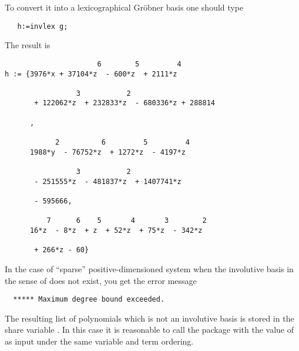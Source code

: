 \hypertarget{operator:INVLEX}{}
To convert it into a lexicographical Gr\"obner basis one should type
\begin{verbatim}
   h:=invlex g;
\end{verbatim}
The result is
\begin{verbatim}
                      6        5         4
h := {3976*x + 37104*z  - 600*z  + 2111*z

                 3           2
       + 122062*z  + 232833*z  - 680336*z + 288814

      ,

            2          6         5         4
      1988*y  - 76752*z  + 1272*z  - 4197*z

                 3           2
       - 251555*z  - 481837*z  + 1407741*z

       - 595666,

          7      6    5       4       3        2
      16*z  - 8*z  + z  + 52*z  + 75*z  - 342*z

       + 266*z - 60}

\end{verbatim}
In the case of ``sparse'' positive-dimensioned system
when the involutive basis in the sense of \cite{ZharkovBlinkov:93} does not exist,
you get the error message
\begin{verbatim}
  ***** Maximum degree bound exceeded.
\end{verbatim}
\hypertarget{variable:INVTEMPBASIS}{}
The resulting list of polynomials which is not an involutive
basis is stored in the share variable . In this case
it is reasonable to call the  package with the value of
 as input under the same variable and term ordering.

